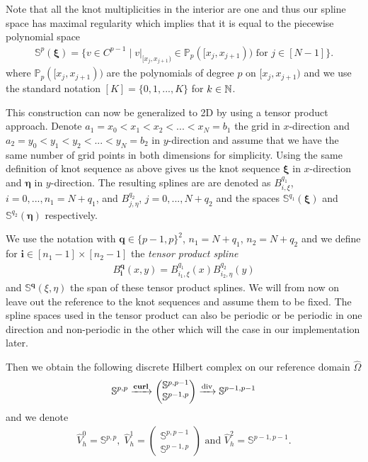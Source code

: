 \documentclass[../master_thesis.tex]{subfiles}
\begin{document}
Note that all the knot multiplicities in the interior are one and thus our spline 
space has maximal regularity which implies that it is equal to the piecewise polynomial space
\begin{align*}
    \mathbb{S}^p(\bm{\xi}) = \{ v \in C^{p-1} \mid v |_{[x_j,x_{j+1})} \in \mathbb{P}_p([x_j,x_{j+1})) 
        \text{ for } j\in [N-1]\}.
\end{align*}
where $\mathbb{P}_p([x_j,x_{j+1}))$ are the polynomials of degree $p$ on $[x_j,x_{j+1})$ 
and we use the standard notation $[K] = \{ 0, 1, ..., K\}$ for $k\in \mathbb{N}$.

This construction can now be generalized to 2D by using a tensor product approach.
Denote $a_1 = x_0 < x_1 < x_2 < ... < x_N = b_1$ the grid in $x$-direction and 
$a_2 = y_0 < y_1 < y_2 < ... < y_N = b_2$ in $y$-direction and assume that we have the 
same number of grid points in both dimensions for simplicity. 
Using the same definition of knot sequence as above gives us the knot sequence 
$\bm{\xi}$ in $x$-direction and $\bm{\eta}$ in $y$-direction. The resulting splines 
are are denoted as $B_{i,\xi}^{q_1}$, $i=0,...,n_1 = N + q_1$, and $B_{j,\eta}^{q_2}$, 
$j = 0,...,N + q_2$ and the spaces
$\mathbb{S}^{q_1}(\bm{\xi})$ and $\mathbb{S}^{q_2}(\bm{\eta})$ respectively.

We use the notation 
with $\mathbf{q} \in \{p-1,p\}^2$, $n_1 = N + q_1$, $n_2 = N + q_2$ 
and we define for $\mathbf{i} \in [n_1-1] \times [n_2-1]$ the \textit{tensor product spline}
\begin{align*}
    B_\mathbf{i}^\mathbf{q}(x,y) =  B_{i_1,\xi}^{q_1}(x) B_{i_2,\eta}^{q_2}(y)
\end{align*}
and $\mathbb{S}^\mathbf{q}(\xi,\eta)$ 
the span of these tensor product splines. We will from now on leave out the reference 
to the knot sequences and assume them to be fixed.
The spline spaces used in the tensor product can also be periodic or be periodic in 
one direction and non-periodic in the other which will the case in our implementation later. 

Then we obtain the following discrete Hilbert complex on our reference domain $\hat{\Omega}$
\begin{align*}
    \mathbb{S}^{p,p} \xrightarrow{\veccurl} \begin{pmatrix}\mathbb{S}^{p,p-1} \\ \mathbb{S}^{p-1,p}  
    \end{pmatrix} \xrightarrow{\diver} \mathbb{S}^{p-1,p-1}
\end{align*}
and we denote
\begin{align}
     \hat{V}^0_h = \mathbb{S}^{p,p}, \; \hat{V}^1_h = \begin{pmatrix}\mathbb{S}^{p,p-1} \\ \mathbb{S}^{p-1,p}  
    \end{pmatrix}
    \text{ and } \hat{V}^2_h = \mathbb{S}^{p-1,p-1}. \label{eq:discrete_spline_reference_spaces}
\end{align}
\end{document}
